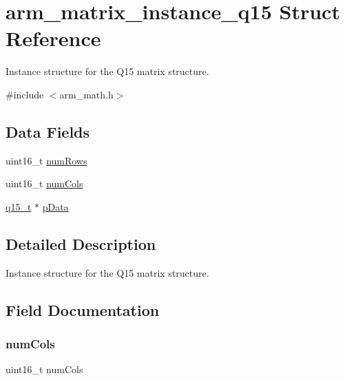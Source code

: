 \hypertarget{structarm__matrix__instance__q15}{}\section{arm\+\_\+matrix\+\_\+instance\+\_\+q15 Struct Reference}
\label{structarm__matrix__instance__q15}


Instance structure for the Q15 matrix structure.  




{\ttfamily \#include $<$arm\+\_\+math.\+h$>$}

\subsection*{Data Fields}
\begin{DoxyCompactItemize}
\item 
uint16\+\_\+t \mbox{\hyperlink{structarm__matrix__instance__q15_a1bcf80ccdc2acc29198f1592ae300390}{num\+Rows}}
\item 
uint16\+\_\+t \mbox{\hyperlink{structarm__matrix__instance__q15_a4bb5ec0d13eb4c9cf887aa8366a44117}{num\+Cols}}
\item 
\mbox{\hyperlink{arm__math_8h_ab5a8fb21a5b3b983d5f54f31614052ea}{q15\+\_\+t}} $\ast$ \mbox{\hyperlink{structarm__matrix__instance__q15_a817ede38365e63e561a12069c6c5c087}{p\+Data}}
\end{DoxyCompactItemize}


\subsection{Detailed Description}
Instance structure for the Q15 matrix structure. 

\subsection{Field Documentation}
\mbox{\label{structarm__matrix__instance__q15_a4bb5ec0d13eb4c9cf887aa8366a44117}} 
\subsubsection{\texorpdfstring{num\+Cols}{numCols}}
{\footnotesize\ttfamily uint16\+\_\+t num\+Cols}

